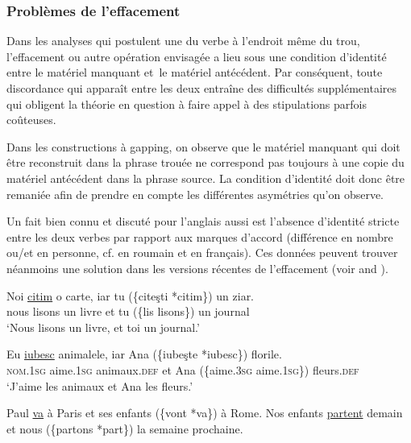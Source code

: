 \subsubsection{Problèmes de l’effacement} \label{ch2:sect2.4.3.3}

Dans les analyses qui postulent une  du verbe à l’endroit même du trou, l’effacement ou autre opération envisagée a lieu sous une condition d’identité entre le matériel manquant et~le matériel antécédent. Par conséquent, toute discordance qui apparaît entre les deux entraîne des difficultés supplémentaires qui obligent la théorie en question à faire appel à des stipulations parfois coûteuses.

Dans les constructions à gapping, on observe que le matériel manquant qui doit être reconstruit dans la phrase trouée ne correspond pas toujours à une copie du matériel antécédent dans la phrase source. La condition d’identité doit donc être remaniée afin de prendre en compte les différentes asymétries qu’on observe.

Un fait bien connu et discuté pour l’anglais aussi est l’absence d’identité stricte entre les deux verbes par rapport aux marques d’accord (différence en nombre ou/et en personne, cf.  en roumain et  en français). Ces données peuvent trouver néanmoins une solution dans les versions récentes de l’effacement (voir \citealt{BeaversEtAl2004} and \citealt{ChavesEtAl2008}). 

\ea \label{ch2:ex231}
\ea 
\gll Noi  \uline{citim}  o  carte,  iar  tu  (\{citeşti {\textbar} *citim\})  un  ziar.\\
nous  lisons  un  livre  et  tu  (\{lis {\textbar} lisons\})  un  journal\\
\glt ‘Nous lisons un livre, et toi un journal.’

\ex 
\gll Eu  \uline{iubesc}  animalele,  iar  Ana  (\{iubeşte {\textbar} *iubesc\})  florile.\\
\textsc{nom.1sg}  aime.\textsc{1sg}  animaux.\textsc{def}  et  Ana  (\{aime.\textsc{3sg} {\textbar} aime.\textsc{1sg\}})  fleurs.\textsc{def}\\
\glt ‘J’aime les animaux et Ana les fleurs.’
\z
\z


\ea \label{ch2:ex232}
\ea Paul \uline{va} à Paris et ses enfants (\{vont {\textbar} *va\}) à Rome.      
\ex Nos enfants \uline{partent} demain et nous (\{partons {\textbar} *part\}) la semaine prochaine.                    
\z
\z

